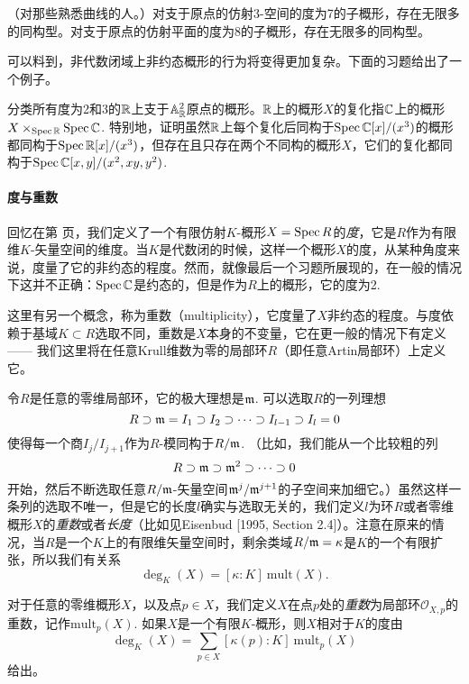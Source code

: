 \begin{exe}
	（对那些熟悉曲线的人。）对支于原点的仿射$3$\hyp 空间的度为7的子概形，存在无限多的同构型。对支于原点的仿射平面的度为8的子概形，存在无限多的同构型。
\end{exe}

可以料到，非代数闭域上非约态概形的行为将变得更加复杂。下面的习题给出了一个例子。

\begin{exe}
	分类所有度为2和3的$\mathbb{R}$上支于$\mathbb{A}_{\mathbb{R}}^2$原点的概形。$\mathbb{R}$上的概形$X$的复化指$\mathbb{C}$上的概形$X\times_{\operatorname{Spec} \mathbb{R}}\operatorname{Spec} \mathbb{C}$. 特别地，证明虽然$\mathbb{R}$上每个复化后同构于$\operatorname{Spec} \mathbb{C}[x]/(x^3)$的概形都同构于$\operatorname{Spec} \mathbb{R}[x]/(x^3)$，但存在且只存在两个不同构的概形$X$，它们的复化都同构于$\operatorname{Spec} \mathbb{C}[x,y]/(x^2,xy,y^2)$.
\end{exe}

\paragraph*{度与重数}
回忆在第 \pageref{deg} 页，我们定义了一个有限仿射$K$\hyp 概形$X=\operatorname{Spec} R$的\textit{度}，它是$R$作为有限维$K$\hyp 矢量空间的维度。当$K$是代数闭的时候，这样一个概形$X$的度，从某种角度来说，度量了它的非约态的程度。然而，就像最后一个习题所展现的，在一般的情况下这并不正确：$\operatorname{Spec} \mathbb{C}$是约态的，但是作为$R$上的概形，它的度为2.

这里有另一个概念，称为重数（multiplicity），它度量了$X$非约态的程度。与度依赖于基域$K\subset R$选取不同，重数是$X$本身的不变量，它在更一般的情况下有定义 ------ 我们这里将在任意Krull维数为零的局部环$R$（即任意Artin局部环）上定义它。

令$R$是任意的零维局部环，它的极大理想是$\mathfrak{m}$. 可以选取$R$的一列理想
\[
	R\supset \mathfrak{m} = I_1\supset I_2\supset \cdots \supset I_{l-1}\supset I_l=0
\]
使得每一个商$I_j/I_{j+1}$作为$R$\hyp 模同构于$R/\mathfrak{m}$. （比如，我们能从一个比较粗的列
\[
	R\supset \mathfrak{m} \supset \mathfrak{m}^2\supset \cdots \supset 0
\]
开始，然后不断选取任意$R/\mathfrak{m}$\hyp 矢量空间$\mathfrak{m}^j/\mathfrak{m}^{j+1}$的子空间来加细它。）虽然这样一条列的选取不唯一，但是它的长度$l$确实与选取无关的，我们定义$l$为环$R$或者零维概形$X$的\textit{重数}或者\textit{长度}（比如见Eisenbud [1995, Section 2.4]）。注意在原来的情况，当$R$是一个$K$上的有限维矢量空间时，剩余类域$R/\mathfrak{m}=\kappa$是$K$的一个有限扩张，所以我们有关系
\[
	\deg_K(X)=[\kappa:K]~\mathrm{mult}(X).
\]

对于任意的零维概形$X$，以及点$p\in X$，我们定义$X$在点$p$处的\textit{重数}为局部环$\mathscr{O}_{X,p}$的重数，记作$\mathrm{mult}_p(X)$. 如果$X$是一个有限$K$\hyp 概形，则$X$相对于$K$的度由
\[
	\deg_K(X)=\sum_{p\in X}[\kappa(p):K]~\mathrm{mult}_p(X)
\]
给出。


